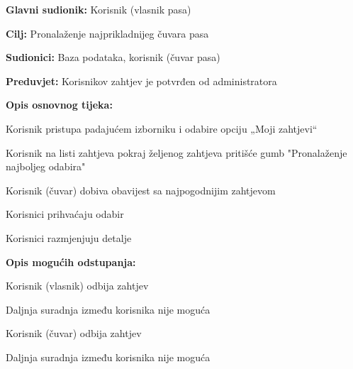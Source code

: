 					\noindent {}
					\begin{packed_item}
						
						\item \textbf{Glavni sudionik: } Korisnik (vlasnik pasa)
						\item  \textbf{Cilj:} Pronalaženje najprikladnijeg čuvara pasa
						\item  \textbf{Sudionici:} Baza podataka, korisnik (čuvar pasa)
						\item  \textbf{Preduvjet:} Korisnikov zahtjev je potvrđen od administratora
						\item  \textbf{Opis osnovnog tijeka:}
						
						\item[] \begin{packed_enum}
							
							\item Korisnik pristupa padajućem izborniku i odabire opciju „Moji zahtjevi“    
							\item Korisnik na listi zahtjeva pokraj željenog zahtjeva pritišće gumb "Pronalaženje najboljeg odabira"  
							\item Korisnik (čuvar) dobiva obavijest sa najpogodnijim zahtjevom
							\item Korisnici prihvaćaju odabir
							\item Korisnici razmjenjuju detalje
							
						\end{packed_enum}
					
						\item  \textbf{Opis mogućih odstupanja:}
			
							\item[] \begin{packed_item}
							\item[4.a] Korisnik (vlasnik) odbija zahtjev
							\item[] \begin{packed_enum}
			
								\item Daljnja suradnja između korisnika nije moguća
			
							\end{packed_enum}
						
							\item[4.b] Korisnik (čuvar) odbija zahtjev
							\item[] \begin{packed_enum}
								
								\item Daljnja suradnja između korisnika nije moguća
								
							\end{packed_enum}
						\end{packed_item}
					\end{packed_item}	
				
